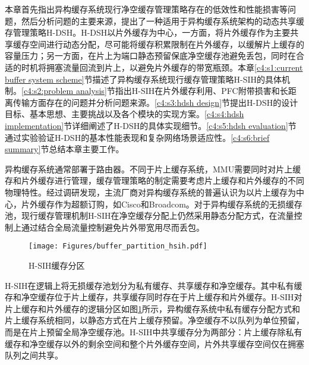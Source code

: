

本章首先指出异构缓存系统现行净空缓存管理策略存在的低效性和性能损害等问题，然后分析问题的主要来源，提出了一种适用于异构缓存系统架构的动态共享缓存管理策略H-DSH。H-DSH以片外缓存为中心，一方面，将片外缓存作为主要共享缓存空间进行动态分配，尽可能将缓存积累限制在片外缓存，以缓解片上缓存的容量压力；另一方面，在片上为端口静态预留保底净空缓存池避免丢包，同时在合适的时机将拥塞流量回流到片上，以避免片外缓存的带宽瓶颈。本章\ref{c4:s1:current buffer system scheme}节描述了异构缓存系统现行缓存管理策略H-SIH的具体机制。\ref{c4:s2:problem analysis}节指出H-SIH在片外缓存利用、PFC附带损害和长距离传输方面存在的问题并分析问题来源。\ref{c4:s3:hdsh design}节提出H-DSH的设计目标、基本思想、主要挑战以及各个模块的实现方案。\ref{c4:s4:hdsh implementation}节详细阐述了H-DSH的具体实现细节。\ref{c4:s5:hdsh evaluation}节通过实验验证H-DSH的基本性能表现和复杂网络场景适应性。\ref{c4:s6:brief summary}节总结本章主要工作。


\label{c4:s1:current buffer system scheme}

异构缓存系统通常部署于路由器。不同于片上缓存系统，MMU需要同时对片上缓存和片外缓存进行管理，缓存管理策略的制定需要考虑片上缓存和片外缓存的不同物理特性。经过调研发现，主流厂商对异构缓存系统的普遍认识为以片上缓存为中心，片外缓存作为超额订购，如Cisco\cite{CiscoNcs5500}和Broadcom\cite{BCM88480}。对于异构缓存系统的无损缓存池，现行缓存管理机制H-SIH在净空缓存分配上仍然采用静态分配方式，在流量控制上通过结合全局流量控制避免片外带宽用尽而丢包。


\begin{figure}[H]
  \centering
  \texttt{[image: Figures/buffer\_partition\_hsih.pdf]}
  \caption{H-SIH缓存分区}
  \label{c4:s1:ss1:fig:hsih buffer partition}
\end{figure}

H-SIH在逻辑上将无损缓存池划分为私有缓存、共享缓存和净空缓存。其中私有缓存和净空缓存位于片上缓存，共享缓存同时存在于片上缓存和片外缓存。H-SIH对片上缓存和片外缓存的逻辑分区如图\ref{c4:s1:ss1:fig:hsih buffer partition}所示，异构缓存系统中私有缓存分配方式和片上缓存系统相同，以静态方式在片上缓存预留。净空缓存不以队列为单位预留，而是在片上预留全局净空缓存池。H-SIH中共享缓存分为两部分：片上缓存除私有缓存和净空缓存以外的剩余空间和整个片外缓存空间，片外共享缓存空间仅在拥塞队列之间共享。

